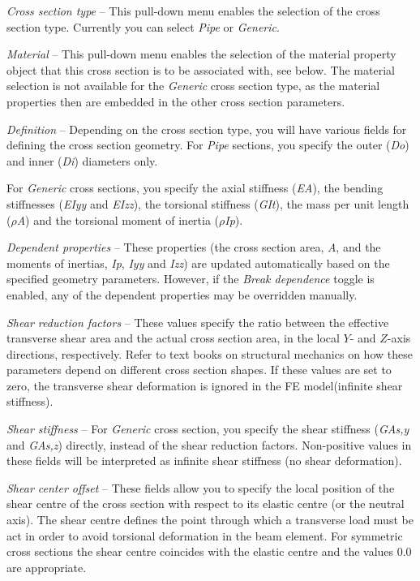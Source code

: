 \begin{bulletlist}
\item{\sl Cross section type} --
  This pull-down menu enables the selection of the cross section type.
  Currently you can select {\sl Pipe} or {\sl Generic}.

\item{\sl Material} --
  This pull-down menu enables the selection of the material property object that
  this cross section is to be associated with,
  see  below. The material selection is
  not available for the {\sl Generic} cross section type, as the material
  properties then are embedded in the other cross section parameters.

\item{\sl Definition} --
  Depending on the cross section type, you will have various fields for defining
  the cross section geometry. For {\sl Pipe} sections, you specify the outer
  ({\sl Do}) and inner ({\sl Di}) diameters only.

\item For {\sl Generic} cross sections,
  you specify the axial stiffness ({\sl EA}),
  the bending stiffnesses ({\sl EIyy} and {\sl EIzz}),
  the torsional stiffness ({\sl GIt}),
  the mass per unit length ($\rho${\sl A})
  and the torsional moment of inertia ($\rho${\sl Ip}).

\item{\sl Dependent properties} --
  These properties (the cross section area, {\sl A},
  and the moments of inertias, {\sl Ip}, {\sl Iyy} and {\sl Izz})
  are updated automatically based on the specified geometry parameters. \newline
  However, if the {\sl Break dependence} toggle is enabled,
  any of the dependent properties may be overridden manually.

\item{\sl Shear reduction factors} --
  These values specify the ratio between the effective transverse shear area and
  the actual cross section area, in the local $Y$- and $Z$-axis directions,
  respectively. Refer to text books on structural mechanics on how these
  parameters depend on different cross section shapes.
  If these values are set to zero, the transverse shear deformation is ignored
  in the FE model(infinite shear stiffness).

\item{\sl Shear stiffness} --
  For {\sl Generic} cross section, you specify the shear stiffness ({\sl GAs,y}
  and {\sl GAs,z}) directly, instead of the shear reduction factors.
  Non-positive values in these fields will be interpreted as infinite
  shear stiffness (no shear deformation).

\item{\sl Shear center offset} --
  These fields allow you to specify the local position of the shear centre of
  the cross section with respect to its elastic centre (or the neutral axis).
  The shear centre defines the point through which a transverse load must be
  act in order to avoid torsional deformation in the beam element.
  For symmetric cross sections the shear centre coincides with the elastic
  centre and the values 0.0 are appropriate.
\end{bulletlist}


